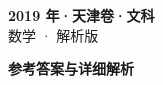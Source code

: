 \documentclass[zihao=-4, a4paper]{ctexart}
\begin{document}
\begin{center}
  {\Large\bfseries 2019 年·天津卷·文科}\\[4pt]
  {\large 数学 · 解析版}
\end{center}
\medskip
{}

\clearpage
{}
\begin{center}{\Large\bfseries 参考答案与详细解析}\end{center}
\medskip

\end{document}
